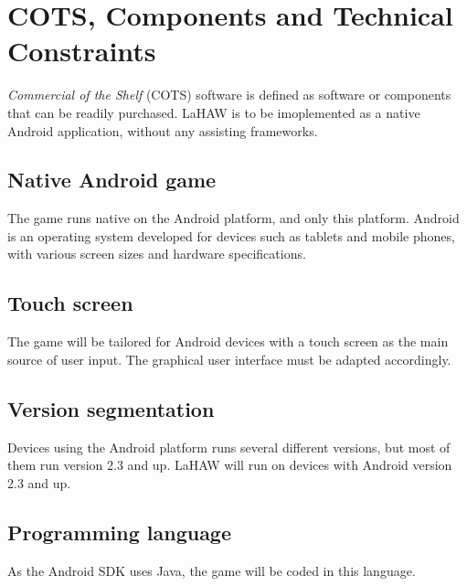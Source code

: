 \chapter{COTS, Components and Technical Constraints}
\emph{Commercial of the Shelf} (COTS) software is defined as software or components that can be readily purchased\cite{pensum}. LaHAW is to be imoplemented as a native Android application, without any assisting frameworks.


\section{Native Android game}
The game runs native on the Android platform, and only this platform. Android is an operating system developed for devices such as tablets and mobile phones, with various screen sizes and hardware specifications.

\section{Touch screen}
The game will be tailored for Android devices with a touch screen as the main source of user input. The graphical user interface must be adapted accordingly. 

\section{Version segmentation}
Devices using the Android platform runs several different versions, but most of them run version 2.3 and up\cite{androidversions}. LaHAW will run on devices with Android version 2.3 and up.

\section{Programming language}
As the Android SDK\cite{androidsdk} uses Java, the game will be coded in this language.